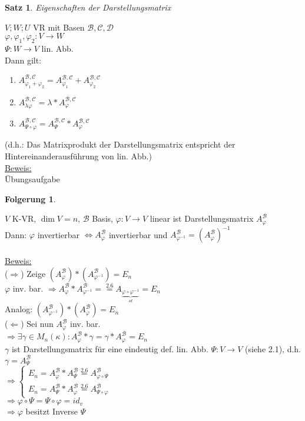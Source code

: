 \documentclass[a4paper,11pt]{article}
\newtheorem{satz}[definition]{Satz}
\newtheorem{folg}[definition]{Folgerung}
\begin{document}
\begin{satz}
	Eigenschaften der Darstellungsmatrix
\end{satz}	
$V;W;U$ VR mit Basen $\mathcal{B},\mathcal{C},\mathcal{D}$ \\
$\varphi,\varphi_1,\varphi_2\colon V\to W$ \\
$\Psi\colon W\to V$ lin. Abb. \\
Dann gilt: 
\begin{enumerate}[label=\alph*)]
	\item $A^{\mathcal{B},\mathcal{C}}_{\varphi_1+\varphi_2}=A^{\mathcal{B},\mathcal{C}}_{\varphi_1}+A^{\mathcal{B},\mathcal{C}}_{\varphi_2}$
	\item $A^{\mathcal{B},\mathcal{C}}_{\lambda\varphi}=\lambda * A^{\mathcal{B},\mathcal{C}}_\varphi$
	\item $A^{\mathcal{B},\mathcal{C}}_{\Psi\circ\varphi}=A^{\mathcal{B},\mathcal{C}}_\Psi*A^{\mathcal{B},\mathcal{C}}_\varphi$
\end{enumerate}
(d.h.: Das Matrixprodukt der Darstellungsmatrix entspricht der Hintereinanderausführung von lin. Abb.) \\
\underline{Beweis:} \\
Übungsaufgabe

\newpage

\begin{folg}
\end{folg}
$V$ K-VR, $\dim V=n$, $\mathcal{B}$ Basis, $\varphi\colon V\to V$ linear ist Darstellungsmatrix $A^\mathcal{B}_\varphi$ \\
Dann: $\varphi$ invertierbar $\Leftrightarrow A^\mathcal{B}_\varphi$ invertierbar und $A^\mathcal{B}_{\varphi^{-1}}=(A^\mathcal{B}_\varphi)^{-1}$ \\
\\
\underline{Beweis:} \\
($\Rightarrow$) Zeige $(A^\mathcal{B}_\varphi) * (A^\mathcal{B}_{\varphi^{-1}})=E_n$ \\
$\varphi$ inv. bar. $\Rightarrow A^\mathcal{B}_\varphi * A^\mathcal{B}_{\varphi^{-1}}=\overset{2.6}{=}A_{\underbrace{\varphi\circ\varphi^{-1}}_{id}}=E_n$ \\
Analog: $(A^\mathcal{B}_{\varphi^{-1}}) * (A^\mathcal{B}_\varphi) =E_n$ \\
($\Leftarrow$) Sei nun $A^\mathcal{B}_\varphi$ inv. bar. \\
$\Rightarrow\exists\gamma\in M_n(\kappa)\colon A^\mathcal{B}_\varphi*\gamma=\gamma*A^\mathcal{B}_\varphi=E_n$ \\
$\gamma$ ist Darstellungsmatrix für eine eindeutig def. lin. Abb. $\Psi\colon V\to V$ (siehe 2.1), d.h. $\gamma=A^\mathcal{B}_\Psi$ \\
$\Rightarrow\left\{\begin{array}{l}E_n=A^\mathcal{B}_\varphi*A^\mathcal{B}_\Psi\overset{2.6}{=}A^\mathcal{B}_{\varphi\circ\Psi} \\ E_n=A^\mathcal{B}_\Psi*A^\mathcal{B}_\varphi\overset{2.6}{=}A^\mathcal{B}_{\Psi\circ\varphi}\end{array}\right.$ \\
$\Rightarrow\varphi\circ\Psi=\Psi\circ\varphi=id_v$ \\
$\Rightarrow\varphi$ besitzt Inverse $\Psi$
\end{document}
